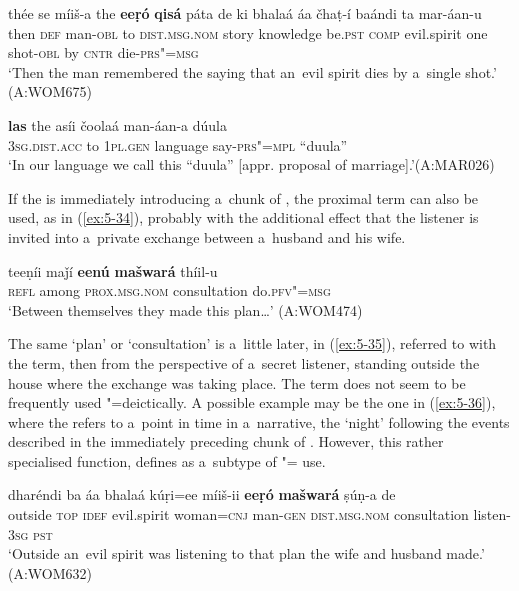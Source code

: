 \ea
\label{ex:5-32}
\gll thée se míiš-a the \textbf{eeṛó} \textbf{qisá} páta de ki bhalaá áa čhaṭ-í baándi ta mar-áan-u\\
then \textsc{def} man-\textsc{obl} to \textsc{dist.msg.nom} story knowledge be.\textsc{pst} \textsc{comp} evil.spirit one shot-\textsc{obl} by \textsc{cntr} die-\textsc{prs"=msg}\\
\glt `Then the man remembered the saying that an~evil spirit dies by a~single shot.' (A:WOM675)
\z

\begin{exe}
\ex
\label{ex:5-33}
\gll \textbf{las} the asíi čoolaá man-áan-a dúula\\
\textsc{3sg}.\textsc{dist.acc} to \textsc{1pl.gen} language say-\textsc{prs"=mpl} ``duula''\\
\glt `In our language we call this ``duula'' [appr. proposal of marriage].'\newline (A:MAR026)
\end{exe}
If the  is immediately introducing a~chunk of , the proximal term can also be used, as in (\ref{ex:5-34}), probably with the additional effect that the listener is invited into a~private exchange between a~husband and his wife. 

\begin{exe}
\ex
\label{ex:5-34}
\gll teeṇíi maǰí \textbf{eenú} \textbf{mašwará} thíil-u \\
\textsc{refl} among \textsc{prox.msg.nom} consultation do.\textsc{pfv"=msg}\\
\glt `Between themselves they made this plan{\ldots}' (A:WOM474)
\end{exe}

The same `plan' or `consultation' is a~little later, in (\ref{ex:5-35}), referred to with the  term, then from the perspective of a~secret listener, standing outside the house where the exchange was taking place. The  term does not seem to be frequently used "=deictically. A possible example may be the one in (\ref{ex:5-36}), where the  refers to a~point in time in a~narrative, the `night' following the events described in the immediately preceding chunk of . However, this rather specialised function, \citet[225]{himmelmann1996} defines as a~subtype of "= use.

\ea\label{ex:5-35}
\gll dharéndi ba áa bhalaá kúṛi=ee míiš-ii \textbf{eeṛó} \textbf{mašwará} ṣúṇ-a de \\
outside \textsc{top} \textsc{idef} evil.spirit woman=\textsc{cnj} man-\textsc{gen} \textsc{dist.msg.nom} consultation listen-\textsc{3sg} \textsc{pst} \\
\glt `Outside an~evil spirit was listening to that plan the wife and husband made.' (A:WOM632)
\z

